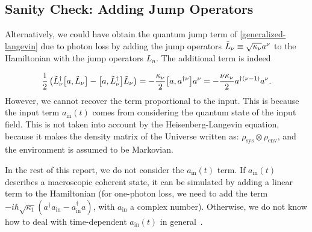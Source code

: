 \subsection{Sanity Check: Adding Jump Operators}

Alternatively, we could have obtain the quantum jump term of \ref{generalized-langevin} due to photon loss by adding the jump operators $\Tilde{L}_\nu \equiv \sqrt{\kappa_\nu} a^\nu$ to the Hamiltonian with the jump operators $L_n$. The additional term is indeed

\begin{equation}
    \frac{1}{2} \left(\Tilde{L}^\dagger_\nu \commutator{a}{\Tilde{L}_\nu} - \commutator{a}{\Tilde{L}^\dagger_\nu} \Tilde{L}_\nu\right) = - \frac{\kappa_\nu}{2} \commutator{a}{a^{\dagger \nu}} a^\nu = - \frac{\nu \kappa_\nu}{2} a^{\dagger (\nu - 1)} a^\nu.
\end{equation}
However, we cannot recover the term proportional to the input. This is because the input term $a_{\text{in}}(t)$ comes from considering the quantum state of the input field. This is not taken into account by the Heisenberg-Langevin equation, because it makes the density matrix of the Universe written as: $\rho_{\text{sys}} \otimes \rho_{\text{env}}$, and the environment is assumed to be Markovian.

\begin{remark}
    In the rest of this report, we do not consider the $a_{\text{in}}(t)$ term. If $a_{\text{in}}(t)$ describes a macroscopic coherent state, it can be simulated by adding a linear term to the Hamiltonian (for one-photon loss, we need to add the term $-i \hbar \sqrt{\kappa_1} \left(a^\dagger a_{\text{in}} - a^\dagger_{\text{in}} a\right)$, with $a_{\text{in}}$ a complex number). Otherwise, we do not know how to deal with time-dependent $a_{\text{in}}(t)$ in general~\cite{non-lin-green, paper-off-non-lin-green}.
\end{remark}
